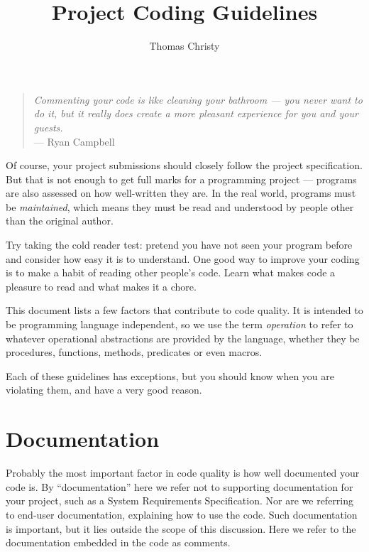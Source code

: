 \documentclass[a4paper]{article}
\title{Project Coding Guidelines}
\author{Thomas Christy}
\begin{document}
\maketitle
\begin{quote}
  \noindent \emph{Commenting your code is like cleaning your bathroom ---
    you never want to do it, but it really does create a more pleasant
    experience for you and your guests.} \\
  \hspace*{5em} --- \textrm{Ryan Campbell}
\end{quote}

\noindent
Of course, your project submissions should closely follow the project
specification.  But that is not enough to get
full marks for a programming project --- programs are also assessed on how
well-written they are.  In the real world, programs must be
\emph{maintained}, which means they must be read and understood by people
other than the original author.  

Try taking the cold reader test:  pretend you have not seen your program
before and consider how easy it is to understand.  One good way to improve
your coding is to make a habit of reading other people's code.  Learn what
makes code a pleasure to read and what makes it a chore.

This document lists a few factors that contribute to code quality.  It is
intended to be programming language independent, so we use the term
\emph{operation} to refer to whatever operational abstractions are provided
by the language, whether they be procedures, functions, methods, predicates
or even macros.

Each of these guidelines has exceptions, but you should know when you are
violating them, and have a very good reason.


\section{Documentation}
\label{sec:doc}

Probably the most important factor in code quality is how well documented
your code is.  By ``documentation'' here we refer not to supporting
documentation for your project, such as a System Requirements Specification.
Nor are we referring to end-user documentation, explaining how to use the
code.  Such documentation is important, but it lies outside the scope of this
discussion.  Here we refer to the documentation embedded in the code as
comments.
\end{document}
